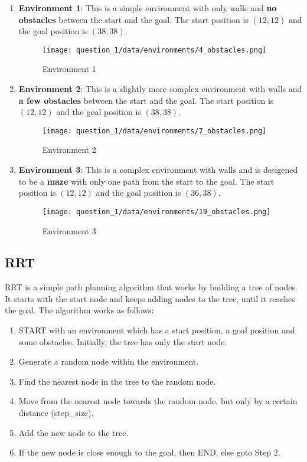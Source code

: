 \documentclass[12pt]{report}
\begin{document}
\begin{enumerate}

    \item \textbf{Environment 1}: This is a simple environment with only walls and \textbf{no obstacles} between the start and the goal. The start position is $(12, 12)$ and the goal position is $(38, 38)$. \label{env1}
          \begin{figure}[H]
              \centering
              \texttt{[image: question\_1/data/environments/4\_obstacles.png]}
              \caption{Environment 1}
          \end{figure}
    \item \textbf{Environment 2}: This is a slightly more complex environment with walls and \textbf{a few obstacles} between the start and the goal. The start position is $(12, 12)$ and the goal position is $(38, 38)$. \label{env2}
          \begin{figure}[H]
              \centering
              \texttt{[image: question\_1/data/environments/7\_obstacles.png]}
              \caption{Environment 2}
          \end{figure}

    \item \textbf{Environment 3}: This is a complex environment with walls and is desigened to be a \textbf{maze} with only one path from the start to the goal. The start position is $(12, 12)$ and the goal position is $(36, 38)$. \label{env3}
          \begin{figure}[H]
              \centering
              \texttt{[image: question\_1/data/environments/19\_obstacles.png]}
              \caption{Environment 3}
          \end{figure}
\end{enumerate}

\subsection{RRT}

RRT is a simple path planning algorithm that works by building a tree of nodes. It starts with the start node and keeps adding nodes to the tree, until it reaches the goal. The algorithm works as follows:

\begin{enumerate}
    \item START with an environment which has a start position, a goal position and some obstacles. Initially, the tree has only the start node.
    \item Generate a random node within the environment.
    \item Find the nearest node in the tree to the random node.
    \item Move from the nearest node towards the random node, but only by a certain distance (step\_size).
    \item Add the new node to the tree.
    \item If the new node is close enough to the goal, then END, else goto Step 2.
\end{enumerate}
\end{document}
